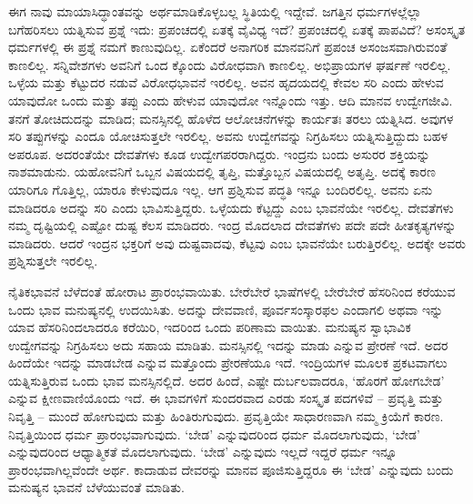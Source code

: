 ಈಗ ನಾವು ಮಾಯಾಸಿದ್ಧಾಂತವನ್ನು ಅರ್ಥಮಾಡಿಕೊಳ್ಳಬಲ್ಲ ಸ್ಥಿತಿಯಲ್ಲಿ ಇದ್ದೇವೆ. ಜಗತ್ತಿನ ಧರ್ಮಗಳಲ್ಲೆಲ್ಲಾ ಬಗೆಹರಿಸಲು ಯತ್ನಿಸುವ ಪ್ರಶ್ನೆ ಇದು: ಪ್ರಪಂಚದಲ್ಲಿ ಏತಕ್ಕೆ ವೈವಿಧ್ಯ ಇದೆ? ಪ್ರಪಂಚದಲ್ಲಿ ಏತಕ್ಕೆ ಪಾಪವಿದೆ? ಅಸಂಸ್ಕೃತ ಧರ್ಮಗಳಲ್ಲಿ ಈ ಪ್ರಶ್ನೆ ನಮಗೆ ಕಾಣುವುದಿಲ್ಲ. ಏಕೆಂದರೆ ಅನಾಗರಿಕ ಮಾನವನಿಗೆ ಪ್ರಪಂಚ ಅಸಂಜಸವಾಗಿರುವಂತೆ ಕಾಣಲಿಲ್ಲ. ಸನ್ನಿವೇಶಗಳು ಅವನಿಗೆ ಒಂದ ಕ್ಕೊಂದು ವಿರೋಧವಾಗಿ ಕಾಣಲಿಲ್ಲ. ಅಭಿಪ್ರಾಯಗಳ ಘರ್ಷಣೆ ಇರಲಿಲ್ಲ. ಒಳ್ಳೆಯ ಮತ್ತು ಕೆಟ್ಟುದರ ನಡುವೆ ವಿರೋಧಭಾವನೆ ಇರಲಿಲ್ಲ. ಅವನ ಹೃದಯದಲ್ಲಿ ಕೇವಲ ಸರಿ ಎಂದು ಹೇಳುವ ಯಾವುದೋ ಒಂದು ಮತ್ತು ತಪ್ಪು ಎಂದು ಹೇಳುವ ಯಾವುದೋ ಇನ್ನೊಂದು ಇತ್ತು. ಆದಿ ಮಾನವ ಉದ್ವೇಗಜೀವಿ. ತನಗೆ ತೋಚಿದುದನ್ನು ಮಾಡಿದ; ಮನಸ್ಸಿನಲ್ಲಿ ಹೊಳೆದ ಆಲೋಚನೆಗಳನ್ನು ಕಾರ್ಯತಃ ತರಲು ಯತ್ನಿಸಿದ. ಅವುಗಳ ಸರಿ ತಪ್ಪುಗಳನ್ನು ಎಂದೂ ಯೋಚಿಸುತ್ತಲೇ ಇರಲಿಲ್ಲ. ಅವನು ಉದ್ವೇಗವನ್ನು ನಿಗ್ರಹಿಸಲು ಯತ್ನಿಸುತ್ತಿದ್ದುದು ಬಹಳ ಅಪರೂಪ. ಅದರಂತೆಯೇ ದೇವತೆಗಳು ಕೂಡ ಉದ್ವೇಗಪರರಾಗಿದ್ದರು. ಇಂದ್ರನು ಬಂದು ಅಸುರರ ಶಕ್ತಿಯನ್ನು ನಾಶಮಾಡುನು. ಯಹೋವನಿಗೆ ಒಬ್ಬನ ವಿಷಯದಲ್ಲಿ ತೃಪ್ತಿ, ಮತ್ತೊಬ್ಬನ ವಿಷಯದಲ್ಲಿ ಅತೃಪ್ತಿ. ಅದಕ್ಕೆ ಕಾರಣ ಯಾರಿಗೂ ಗೊತ್ತಿಲ್ಲ, ಯಾರೂ ಕೇಳುವುದೂ ಇಲ್ಲ. ಆಗ ಪ್ರಶ್ನಿಸುವ ಪದ್ಧತಿ ಇನ್ನೂ ಬಂದಿರಲಿಲ್ಲ. ಅವನು ಏನು ಮಾಡಿದರೂ ಅದನ್ನು ಸರಿ ಎಂದು ಭಾವಿಸುತ್ತಿದ್ದರು. ಒಳ್ಳೆಯದು ಕೆಟ್ಟದ್ದು ಎಂಬ ಭಾವನೆಯೇ ಇರಲಿಲ್ಲ. ದೇವತೆಗಳು ನಮ್ಮ ದೃಷ್ಟಿಯಲ್ಲಿ ಎಷ್ಟೋ ದುಷ್ಟ ಕೆಲಸ ಮಾಡಿದರು. ಇಂದ್ರ ಮೊದಲಾದ ದೇವತೆಗಳು ಪದೇ ಪದೇ ಹೀತಕೃತ್ಯಗಳನ್ನು ಮಾಡಿದರು. ಆದರೆ ಇಂದ್ರನ ಭಕ್ತರಿಗೆ ಅವು ದುಷ್ಟವಾದವು, ಕೆಟ್ಟವು ಎಂಬ ಭಾವನೆಯೇ ಬರುತ್ತಿರಲಿಲ್ಲ. ಅದಕ್ಕೇ ಅವರು ಪ್ರಶ್ನಿಸುತ್ತಲೇ ಇರಲಿಲ್ಲ.

ನೈತಿಕಭಾವನೆ ಬೆಳೆದಂತೆ ಹೋರಾಟ ಪ್ರಾರಂಭವಾಯಿತು. ಬೇರೆಬೇರೆ ಭಾಷೆಗಳಲ್ಲಿ ಬೇರೆಬೇರೆ ಹೆಸರಿನಿಂದ ಕರೆಯುವ ಒಂದು ಭಾವ ಮನುಷ್ಯನಲ್ಲಿ ಉದಯಿಸಿತು. ಅದನ್ನು ದೇವವಾಣಿ, ಪೂರ್ವಸಂಸ್ಕಾರಫಲ ಎಂದಾಗಲಿ ಅಥವಾ ಇನ್ನು ಯಾವ ಹೆಸರಿನಿಂದಲಾದರೂ ಕರೆಯಿರಿ, ಇದರಿಂದ ಒಂದು ಪರಿಣಾಮ ವಾಯಿತು. ಮನುಷ್ಯನ ಸ್ವಾಭಾವಿಕ ಉದ್ವೇಗವನ್ನು ನಿಗ್ರಹಿಸಲು ಅದು ಸಹಾಯ ಮಾಡಿತು. ಮನಸ್ಸಿನಲ್ಲಿ ಇದನ್ನು ಮಾಡು ಎನ್ನುವ ಪ್ರೇರಣೆ ಇದೆ. ಅದರ ಹಿಂದೆಯೇ ಇದನ್ನು ಮಾಡಬೇಡ ಎನ್ನುವ ಮತ್ತೊಂದು ಪ್ರೇರಣೆಯೂ ಇದೆ. ಇಂದ್ರಿಯಗಳ ಮೂಲಕ ಪ್ರಕಟವಾಗಲು ಯತ್ನಿಸುತ್ತಿರುವ ಒಂದು ಭಾವ ಮನಸ್ಸಿನಲ್ಲಿದೆ. ಅದರ ಹಿಂದೆ, ಎಷ್ಟೇ ದುರ್ಬಲವಾದರೂ, ‘ಹೊರಗೆ ಹೋಗಬೇಡ’ ಎನ್ನುವ ಕ್ಷೀಣವಾಣಿಯೊಂದು ಇದೆ. ಈ ಭಾವಗಳಿಗೆ ಸುಂದರವಾದ ಎರಡು ಸಂಸ್ಕೃತ ಪದಗಳಿವೆ – ಪ್ರವೃತ್ತಿ ಮತ್ತು ನಿವೃತ್ತಿ – ಮುಂದೆ ಹೋಗುವುದು ಮತ್ತು ಹಿಂತಿರುಗುವುದು. ಪ್ರವೃತ್ತಿಯೇ ಸಾಧಾರಣವಾಗಿ ನಮ್ಮ ಕ್ರಿಯೆಗೆ ಕಾರಣ. ನಿವೃತ್ತಿಯಿಂದ ಧರ್ಮ ಪ್ರಾರಂಭವಾಗುವುದು. ‘ಬೇಡ’ ಎನ್ನುವುದರಿಂದ ಧರ್ಮ ಮೊದಲಾಗುವುದು, ‘ಬೇಡ’ ಎನ್ನುವುದರಿಂದ ಆಧ್ಯಾತ್ಮಿಕತೆ ಮೊದಲಾಗುವುದು. ‘ಬೇಡ’ ಎನ್ನುವುದು ಇಲ್ಲದೆ ಇದ್ದರೆ ಧರ್ಮ ಇನ್ನೂ ಪ್ರಾರಂಭವಾಗಿಲ್ಲವೆಂದೇ ಅರ್ಥ. ಕಾದಾಡುವ ದೇವರನ್ನು ಮಾನವ ಪೂಜಿಸುತ್ತಿದ್ದರೂ ಈ ‘ಬೇಡ’ ಎನ್ನುವುದು ಬಂದು ಮನುಷ್ಯನ ಭಾವನೆ ಬೆಳೆಯುವಂತೆ ಮಾಡಿತು.

